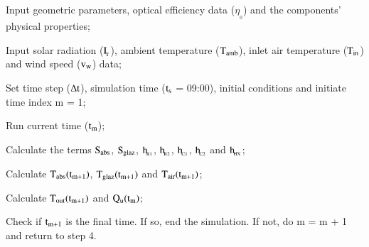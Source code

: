 \begin{description}[before={\setcounter{descriptcount}{0}},font=\bfseries\stepcounter{descriptcount}\thedescriptcount~]
	\item Input geometric parameters, optical efficiency data ($\eta_{\!_{0}}$) and the components' physical properties;
	\item Input solar radiation ($\rm{I_{\!_T}}$), ambient temperature ($\rm{T_{amb}}$), inlet air temperature ($\rm{T_{in}}$) and wind speed ($\rm{v_w}$) data;
	\item Set time step ($\Delta \rm{t}$), simulation time ($\rm{t_{s}}$ = 09:00), initial conditions and initiate time index m = 1;
	\item Run current time ($\rm{t_m}$);
	\item Calculate the terms $\rm{S_{abs}}$, $\rm{S_{glaz}}$, $\rm{h_{\!_{R1}}}$, $\rm{h_{\!_{R2}}}$, $\rm{h_{\!_{C1}}}$, $\rm{h_{\!_{C2}}}$ and $\rm{h_{\!_{HX}}}$;
	\item Calculate $\rm{T_{abs}}(t_{m+1})$, $\rm{T_{glaz}}(t_{m+1})$ and $\rm{T_{air}}(t_{m+1})$;
	\item Calculate $\rm{T_{out}}(t_{m+1})$ and $\rm{Q_u}(t_m)$;
	\item Check if $\rm{t_{m+1}}$ is the final time. If so, end the simulation. If not, do m = m + 1 and return to step 4.
\end{description}

